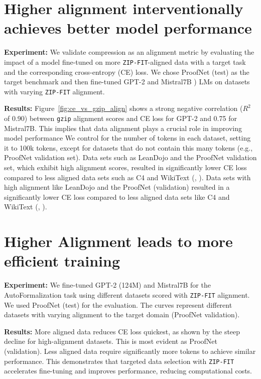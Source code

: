 \section{Higher alignment interventionally achieves better model performance }

\textbf{Experiment:} We validate compression as an alignment metric by evaluating the impact of a model fine-tuned on more \texttt{ZIP-FIT}-aligned data with a target task and the corresponding cross-entropy (CE) loss.  
We chose ProofNet (test) as the target benchmark and then fine-tuned GPT-2 \cite{radford2019language} and Mistral7B \cite{mistral7b} ) LMs on datasets with varying \texttt{ZIP-FIT} alignment. 

\textbf{Results:} Figure~\ref{fig:ce_vs_gzip_align} shows a strong negative correlation ($R^2$ of 0.90) between \texttt{gzip} alignment scores and CE loss for GPT-2 and 0.75 for Mistral7B. 
This implies that data alignment plays a crucial role in improving model performance 
We control for the number of tokens in each dataset, setting it to 100k tokens, except for datasets that do not contain this many tokens (e.g., ProofNet validation set). 
Data sets such as LeanDojo \cite{yang2023leandojo} and the ProofNet validation set, which exhibit high alignment scores, resulted in significantly lower CE loss compared to less aligned data sets such as C4 and WikiText (\cite{raffel2020exploring}, \cite{merity2016pointer}).
Data sets with high alignment like LeanDojo \cite{yang2023leandojo} and the ProofNet (validation) resulted in a significantly lower CE loss compared to less aligned data sets like C4 and WikiText (\cite{raffel2020exploring}, \cite{merity2016pointer}).


\section{Higher Alignment leads to more efficient training}

\textbf{Experiment:} We fine-tuned GPT-2 (124M) and Mistral7B for the AutoFormalization task using different datasets scored with \texttt{ZIP-FIT} alignment. We used ProofNet (test) for the evaluation.
The curves represent different datasets with varying alignment to the target domain (ProofNet validation). 

\textbf{Results:} More aligned data reduces CE loss quickest, as shown by the steep decline for high-alignment datasets. 
This is most evident as ProofNet (validation). %
Less aligned data require significantly more tokens to achieve similar performance. 
This demonstrates that targeted data selection with \texttt{ZIP-FIT} accelerates fine-tuning and improves performance, reducing computational costs. 

